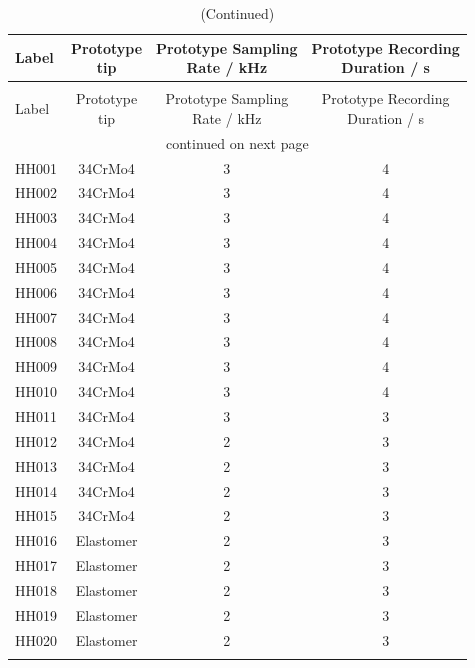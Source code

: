 {\scriptsize%
\begin{longtable}{lccc}
\caption[Hammer-Hammer Test Measurements]{Hammer-hammer test measurements}\\
\toprule
Label & \makecell{Prototype\\tip} & \makecell{Prototype Sampling\\Rate / \si{\kilo\hertz}} & \makecell{Prototype Recording\\Duration / \si{\second}}\\
\midrule
\endfirsthead%
\caption[]{(Continued)}\\
\toprule
Label & \makecell{Prototype\\tip} & \makecell{Prototype Sampling\\Rate / \si{\kilo\hertz}} & \makecell{Prototype Recording\\Duration / \si{\second}}\\
\midrule
\endhead%
\midrule
\multicolumn{4}{c}{continued on next page}\\
\bottomrule
\endfoot%
\endlastfoot%
\hline
	HH001 & 34CrMo4 & 3 & 4\\
	HH002 & 34CrMo4 & 3 & 4\\
	HH003 & 34CrMo4 & 3 & 4\\
	HH004 & 34CrMo4 & 3 & 4\\
	HH005 & 34CrMo4 & 3 & 4\\
	HH006 & 34CrMo4 & 3 & 4\\
	HH007 & 34CrMo4 & 3 & 4\\
	HH008 & 34CrMo4 & 3 & 4\\
	HH009 & 34CrMo4 & 3 & 4\\
	HH010 & 34CrMo4 & 3 & 4\\
	HH011 & 34CrMo4 & 3 & 3\\
	HH012 & 34CrMo4 & 2 & 3\\
	HH013 & 34CrMo4 & 2 & 3\\
	HH014 & 34CrMo4 & 2 & 3\\
	HH015 & 34CrMo4 & 2 & 3\\
	HH016 & Elastomer & 2 & 3\\
	HH017 & Elastomer & 2 & 3\\
	HH018 & Elastomer & 2 & 3\\
	HH019 & Elastomer & 2 & 3\\
	HH020 & Elastomer & 2 & 3\\
\bottomrule
\label{tab:hh_tests}
\end{longtable}
}

